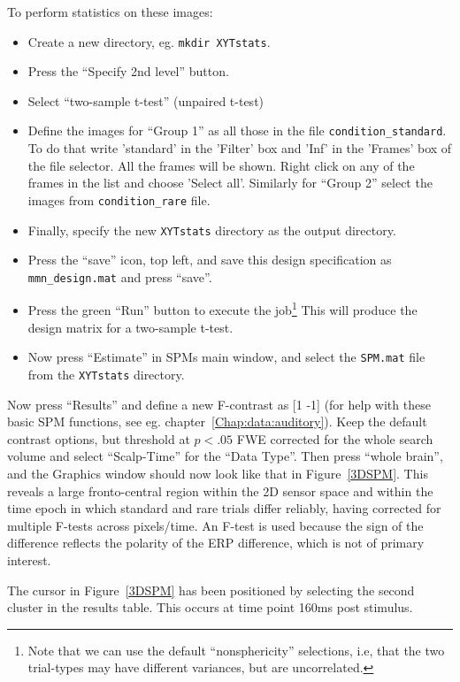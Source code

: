 To perform statistics on these images:
\begin{itemize}
\item{Create a new directory, eg. \texttt{mkdir XYTstats}.}
\item{Press the ``Specify 2nd level'' button.}
\item{Select ``two-sample t-test'' (unpaired t-test)}
\item{Define the images for ``Group 1'' as all those in the file  \texttt{condition\_standard}. To do that write 'standard' in the 'Filter' box and 'Inf' in the 'Frames' box of the file selector. All the frames will be shown. Right click on any of the frames in the list and choose 'Select all'. Similarly for  ``Group 2''  select the images from   \texttt{condition\_rare}  file.}
\item{Finally, specify the new \texttt{XYTstats} directory as the output directory.}
\item{Press the ``save'' icon, top left, and save this design specification as \texttt{mmn\_design.mat} and press ``save''.}
\item{Press the green ``Run'' button to execute the job\footnote{Note that we can use the default ``nonsphericity'' selections, i.e, that the two trial-types may have different variances, but are uncorrelated.} This will produce the design matrix for a two-sample t-test.}
\item{Now press ``Estimate'' in SPMs main window, and select the \texttt{SPM.mat} file from the \texttt{XYTstats} directory.}
\end{itemize}
Now press ``Results'' and define a new F-contrast as [1 -1] (for help with these basic SPM functions, see eg. chapter~\ref{Chap:data:auditory}). Keep the default contrast options, but threshold at $p<.05$ FWE corrected for the whole search volume and select ``Scalp-Time'' for the ``Data Type''. Then press ``whole brain'', and the Graphics window should now look like that in Figure~\ref{3DSPM}. This reveals a large fronto-central region within the 2D sensor space and within the time epoch in which standard and rare trials differ reliably, having corrected for multiple F-tests across pixels/time. An F-test is used because the sign of the difference reflects the polarity of the ERP difference, which is not of primary interest.

The cursor in Figure~\ref{3DSPM} has been positioned by selecting the second cluster in the results table. This occurs at time point 160ms post stimulus.

